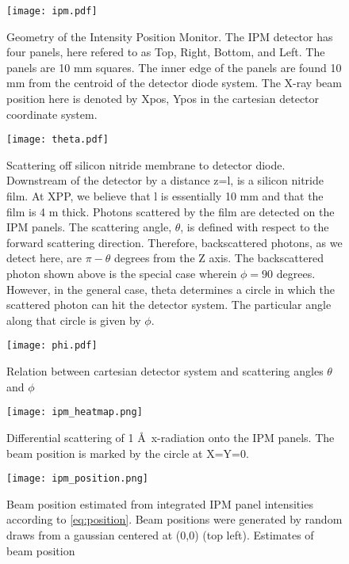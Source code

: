 \documentclass{report}
\begin{document}
\begin{figure}
\centering
\texttt{[image: ipm.pdf]}
\caption{Geometry of the Intensity Position Monitor. The IPM detector has four panels, here refered to as Top, Right, Bottom, and Left. The panels are 10 mm squares. The inner edge of the panels are found 10 mm from the centroid of the detector diode system. The X-ray beam position here is denoted by Xpos, Ypos in the cartesian detector coordinate system.}
\label{ipm}
\end{figure}

\begin{figure}
\centering
\texttt{[image: theta.pdf]}
\caption{Scattering off silicon nitride membrane to detector diode. 
Downstream of the detector by a distance z=l, is a silicon nitride film. 
At XPP, we believe that l is essentially 10 mm and that the film is 4 \textmu m thick. 
Photons scattered by the film are detected on the IPM panels. 
The scattering angle, $\theta$, is defined with respect to the forward scattering direction. 
Therefore, backscattered photons, as we detect here, are $\pi-\theta$  degrees from the Z axis. 
The backscattered photon shown above is the special case wherein $\phi=90$ degrees. 
However, in the general case, theta determines a circle in which the scattered photon can hit the detector system. 
The particular angle along that circle is given by $\phi$. 
}
\label{theta}
\end{figure}

\begin{figure}
\centering
\texttt{[image: phi.pdf]}
\caption{Relation between cartesian detector system and scattering angles $\theta$ and $\phi$}
\label{phi}
\end{figure}

\begin{figure} 
\centering
\texttt{[image: ipm\_heatmap.png]}
\caption{Differential scattering of 1 \AA\ x-radiation onto the IPM panels. The beam position is marked by the circle at X=Y=0.}
\label{ipm_heatmap}
\end{figure}

\begin{figure} 
\centering
\texttt{[image: ipm\_position.png]}
\caption{Beam position estimated from integrated IPM panel intensities according to \ref{eq:position}. Beam positions were generated by random draws from a gaussian centered at (0,0) (top left). Estimates of beam position }
\label{fig:ipm_position}
\end{figure}
\end{document}
